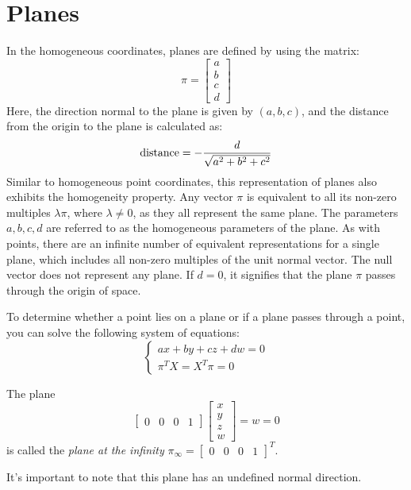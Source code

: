 \section{Planes}

In the homogeneous coordinates, planes are defined by using the matrix: 
\[\pi=\begin{bmatrix} a \\ b \\c \\d \end{bmatrix}\]
Here, the direction normal to the plane is given by $(a, b, c)$, and the distance from the origin to the plane is calculated as:
\[\textnormal{distance}=-\dfrac{d}{\sqrt{a^2+b^2+c^2}}\]
Similar to homogeneous point coordinates, this representation of planes also exhibits the homogeneity property.
Any vector $\pi$ is equivalent to all its non-zero multiples $\lambda \pi$, where $\lambda \neq 0$, as they all represent the same plane.
The parameters $a, b, c, d$ are referred to as the homogeneous parameters of the plane.
As with points, there are an infinite number of equivalent representations for a single plane, which includes all non-zero multiples of the unit normal vector.
The null vector does not represent any plane. 
If $d=0$, it signifies that the plane $\pi$ passes through the origin of space.

To determine whether a point lies on a plane or if a plane passes through a point, you can solve the following system of equations:
\[
\begin{cases}
    ax+by+cz+dw=0 \\
    \pi^TX=X^T\pi=0
\end{cases}
\]
\begin{definition}
    The plane 
    \[\begin{bmatrix} 0 & 0 & 0 & 1 \end{bmatrix} \begin{bmatrix} x \\ y \\ z \\ w \end{bmatrix}=w=0\] 
    is called the \emph{plane at the infinity} $\pi_{\infty}={\begin{bmatrix} 0 & 0 & 0 & 1 \end{bmatrix}}^T$. 
\end{definition}
It's important to note that this plane has an undefined normal direction.